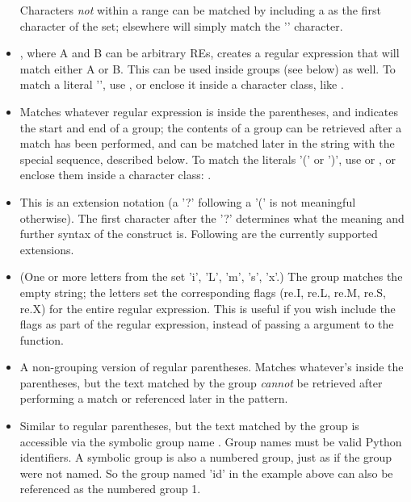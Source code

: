 \begin{itemize}
Characters \emph{not} within a range can be matched by including a
\code{\^} as the first character of the set; \code{\^} elsewhere will
simply match the '\code{\^}' character.  
%
\item[\code{|}], where A and B can be arbitrary REs,
creates a regular expression that will match either A or B.  This can
be used inside groups (see below) as well.  To match a literal '\code{|}',
use \code{\e|}, or enclose it inside a character class, like \code{[|]}.
%
\item[\code{(...)}] Matches whatever regular expression is inside the
parentheses, and indicates the start and end of a group; the contents
of a group can be retrieved after a match has been performed, and can
be matched later in the string with the  special
sequence, described below.  To match the literals '(' or ')', 
use \code{\e(} or \code{\e)}, or enclose them inside a character
class: \code{[(] [)]}.
%
\item[\code{(?...)}] This is an extension notation (a '?' following a
'(' is not meaningful otherwise).  The first character after the '?'
determines what the meaning and further syntax of the construct is.
Following are the currently supported extensions.
%
\item[\code{(?iLmsx)}] (One or more letters from the set 'i', 'L', 'm', 's',
'x'.) The group matches the empty string; the letters set the
corresponding flags (re.I, re.L, re.M, re.S, re.X) for the entire regular
expression.  This is useful if you wish include the flags as part of
the regular expression, instead of passing a  argument to
the  function. 
%
\item[\code{(?:...)}] A non-grouping version of regular parentheses.
Matches whatever's inside the parentheses, but the text matched by the
group \emph{cannot} be retrieved after performing a match or
referenced later in the pattern. 
%
\item[\code{(?P<\var{name}>...)}] Similar to regular parentheses, but
the text matched by the group is accessible via the symbolic group
name .  Group names must be valid Python identifiers.  A
symbolic group is also a numbered group, just as if the group were not
named.  So the group named 'id' in the example above can also be
referenced as the numbered group 1.


\end{itemize}
